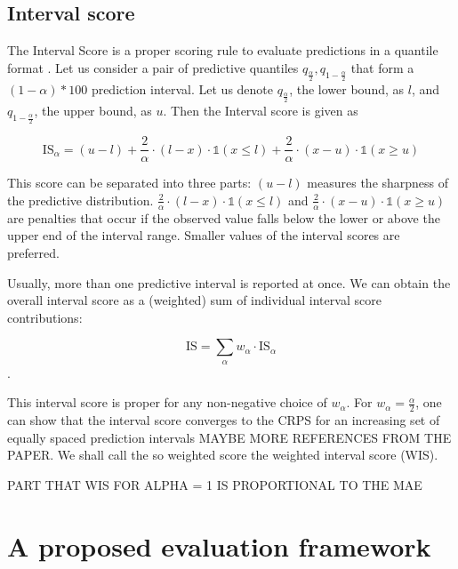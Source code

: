 \documentclass[
]{book}
\begin{document}
\hypertarget{interval-score}{%
\subsection{Interval score}\label{interval-score}}

The Interval Score is a proper scoring rule to evaluate predictions in a quantile format \citep{bracherEvaluatingEpidemicForecasts2020, gneitingStrictlyProperScoring2007}. Let us consider a pair of predictive quantiles \(q_{\frac{\alpha}{2}}, q_{1-\frac{\alpha}{2}}\) that form a \((1 - \alpha) * 100\) prediction interval. Let us denote \(q_{\frac{\alpha}{2}}\), the lower bound, as \(l\), and \(q_{1-\frac{\alpha}{2}}\), the upper bound, as \(u\). Then the Interval score is given as

\[\text{IS}_{\alpha} = (u - l) + \frac{2}{\alpha} \cdot (l - x) \cdot \mathbb{1}(x \leq l) 
+ \frac{2}{\alpha} \cdot (x - u) \cdot \mathbb{1}(x \geq u)\]

This score can be separated into three parts: \((u - l)\) measures the sharpness of the predictive distribution. \(\frac{2}{\alpha} \cdot (l - x) \cdot \mathbb{1}(x \leq l)\) and \(\frac{2}{\alpha} \cdot (x - u) \cdot \mathbb{1}(x \geq u)\) are penalties that occur if the observed value falls below the lower or above the upper end of the interval range. Smaller values of the interval scores are preferred.

Usually, more than one predictive interval is reported at once. We can obtain the overall interval score as a (weighted) sum of individual interval score contributions:

\[ \text{IS} = \sum_\alpha w_\alpha \cdot \text{IS}_\alpha\].

This interval score is proper for any non-negative choice of \(w_\alpha\). For \(w_\alpha = \frac{\alpha}{2}\), one can show that the interval score converges to the CRPS for an increasing set of equally spaced prediction intervals \citep{bracherEvaluatingEpidemicForecasts2020} MAYBE MORE REFERENCES FROM THE PAPER. We shall call the so weighted score the weighted interval score (WIS).

PART THAT WIS FOR ALPHA = 1 IS PROPORTIONAL TO THE MAE

\hypertarget{a-proposed-evaluation-framework}{%
\section{A proposed evaluation framework}\label{a-proposed-evaluation-framework}}
\end{document}
